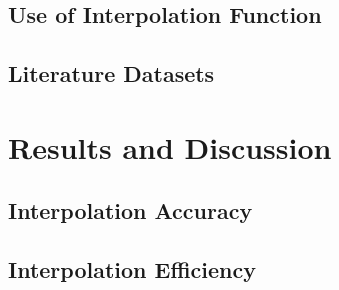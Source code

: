 \subsection{Use of Interpolation Function}
\subsection{Literature Datasets}
\section{Results and Discussion} 
\subsection{Interpolation Accuracy}
\subsection{Interpolation Efficiency}
